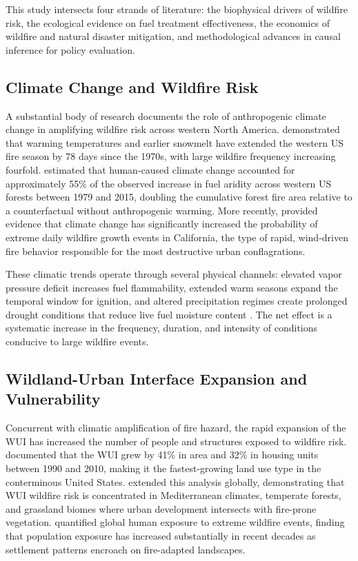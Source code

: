 \documentclass[12pt, letterpaper]{article}
\begin{document}
This study intersects four strands of literature: the biophysical drivers of wildfire risk, the ecological evidence on fuel treatment effectiveness, the economics of wildfire and natural disaster mitigation, and methodological advances in causal inference for policy evaluation.

\subsection{Climate Change and Wildfire Risk}

A substantial body of research documents the role of anthropogenic climate change in amplifying wildfire risk across western North America. \citet{westerling2006} demonstrated that warming temperatures and earlier snowmelt have extended the western US fire season by 78 days since the 1970s, with large wildfire frequency increasing fourfold. \citet{abatzoglou2016} estimated that human-caused climate change accounted for approximately 55\% of the observed increase in fuel aridity across western US forests between 1979 and 2015, doubling the cumulative forest fire area relative to a counterfactual without anthropogenic warming. More recently, \citet{brown2023} provided evidence that climate change has significantly increased the probability of extreme daily wildfire growth events in California, the type of rapid, wind-driven fire behavior responsible for the most destructive urban conflagrations.

These climatic trends operate through several physical channels: elevated vapor pressure deficit increases fuel flammability, extended warm seasons expand the temporal window for ignition, and altered precipitation regimes create prolonged drought conditions that reduce live fuel moisture content \citep{abatzoglou2016}. The net effect is a systematic increase in the frequency, duration, and intensity of conditions conducive to large wildfire events.

\subsection{Wildland-Urban Interface Expansion and Vulnerability}

Concurrent with climatic amplification of fire hazard, the rapid expansion of the WUI has increased the number of people and structures exposed to wildfire risk. \citet{radeloff2018} documented that the WUI grew by 41\% in area and 32\% in housing units between 1990 and 2010, making it the fastest-growing land use type in the conterminous United States. \citet{chen2024} extended this analysis globally, demonstrating that WUI wildfire risk is concentrated in Mediterranean climates, temperate forests, and grassland biomes where urban development intersects with fire-prone vegetation. \citet{bowman2017} quantified global human exposure to extreme wildfire events, finding that population exposure has increased substantially in recent decades as settlement patterns encroach on fire-adapted landscapes.
\end{document}

